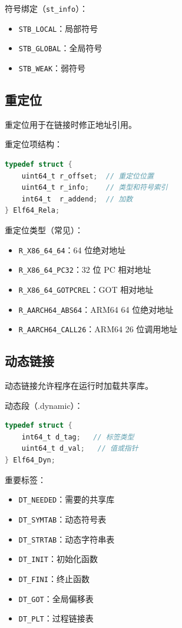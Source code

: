符号绑定（\lstinline!st_info!）：
\begin{itemize}
  \item \texttt{STB\_LOCAL}：局部符号
  \item \texttt{STB\_GLOBAL}：全局符号
  \item \texttt{STB\_WEAK}：弱符号
\end{itemize}

\subsection{重定位}


重定位用于在链接时修正地址引用。

重定位项结构：
\begin{lstlisting}[language=C]
typedef struct {
    uint64_t r_offset;  // 重定位位置
    uint64_t r_info;    // 类型和符号索引
    int64_t  r_addend;  // 加数
} Elf64_Rela;
\end{lstlisting}

重定位类型（常见）：
\begin{itemize}
  \item \texttt{R\_X86\_64\_64}：64 位绝对地址
  \item \texttt{R\_X86\_64\_PC32}：32 位 PC 相对地址
  \item \texttt{R\_X86\_64\_GOTPCREL}：GOT 相对地址
  \item \texttt{R\_AARCH64\_ABS64}：ARM64 64 位绝对地址
  \item \texttt{R\_AARCH64\_CALL26}：ARM64 26 位调用地址
\end{itemize}

\subsection{动态链接}


动态链接允许程序在运行时加载共享库。

动态段（.dynamic）：
\begin{lstlisting}[language=C]
typedef struct {
    int64_t d_tag;   // 标签类型
    uint64_t d_val;   // 值或指针
} Elf64_Dyn;
\end{lstlisting}

重要标签：
\begin{itemize}
  \item \texttt{DT\_NEEDED}：需要的共享库
  \item \texttt{DT\_SYMTAB}：动态符号表
  \item \texttt{DT\_STRTAB}：动态字符串表
  \item \texttt{DT\_INIT}：初始化函数
  \item \texttt{DT\_FINI}：终止函数
  \item \texttt{DT\_GOT}：全局偏移表
  \item \texttt{DT\_PLT}：过程链接表
\end{itemize}

